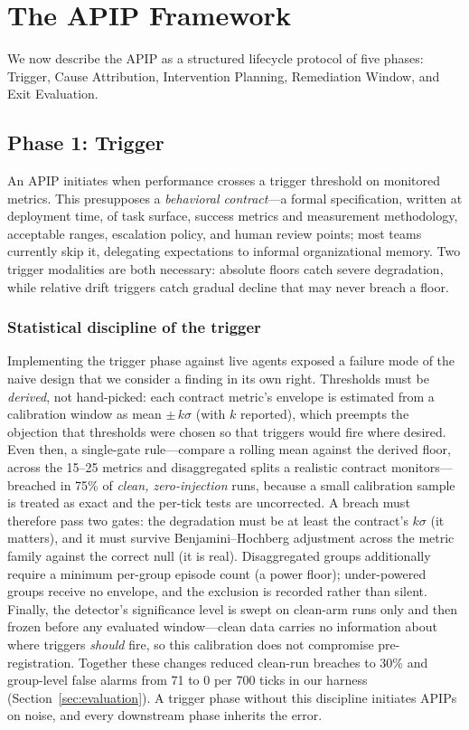 \documentclass[conference]{IEEEtran}
\begin{document}
\section{The APIP Framework}
\label{sec:framework}

We now describe the APIP as a structured lifecycle protocol of five phases:
Trigger, Cause Attribution, Intervention Planning, Remediation Window, and Exit
Evaluation.

\subsection{Phase 1: Trigger}
\label{sec:trigger}

An APIP initiates when performance crosses a trigger threshold on monitored
metrics. This presupposes a \emph{behavioral contract}---a formal
specification, written at deployment time, of task surface, success metrics and
measurement methodology, acceptable ranges, escalation policy, and human review
points; most teams currently skip it, delegating expectations to informal
organizational memory. Two trigger modalities are both necessary: absolute
floors catch severe degradation, while relative drift triggers catch gradual
decline that may never breach a floor.

\subsubsection{Statistical discipline of the trigger}
Implementing the trigger phase against live agents exposed a failure mode of the
naive design that we consider a finding in its own right. Thresholds must be
\emph{derived}, not hand-picked: each contract metric's envelope is estimated
from a calibration window as mean $\pm\,k\sigma$ (with $k$ reported), which
preempts the objection that thresholds were chosen so that triggers would fire
where desired. Even then, a single-gate rule---compare a rolling mean against the
derived floor, across the 15--25 metrics and disaggregated splits a realistic
contract monitors---breached in 75\% of \emph{clean, zero-injection} runs,
because a small calibration sample is treated as exact and the per-tick tests are
uncorrected. A breach must therefore pass two gates: the degradation must be at
least the contract's $k\sigma$ (it matters), and it must survive
Benjamini--Hochberg adjustment across the metric family against the correct null
(it is real). Disaggregated groups additionally require a minimum per-group
episode count (a power floor); under-powered groups receive no envelope, and the
exclusion is recorded rather than silent. Finally, the detector's significance
level is swept on clean-arm runs only and then frozen before any evaluated
window---clean data carries no information about where triggers \emph{should}
fire, so this calibration does not compromise pre-registration. Together these
changes reduced clean-run breaches to 30\% and group-level false alarms from 71
to 0 per 700 ticks in our harness (Section~\ref{sec:evaluation}). A trigger phase
without this discipline initiates APIPs on noise, and every downstream phase
inherits the error.
\end{document}
